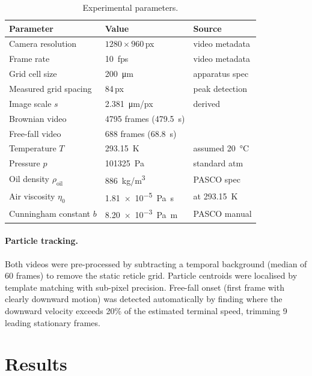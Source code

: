 \documentclass[12pt,a4paper]{article}
\begin{document}
\begin{table}[h]
\centering
\caption{Experimental parameters.}
\label{tab:setup}
\begin{tabular}{lll}
\toprule
Parameter & Value & Source \\
\midrule
Camera resolution        & $1280\times960$\,px         & video metadata \\
Frame rate               & \SI{10}{fps}                & video metadata \\
Grid cell size           & \SI{200}{\micro\metre}      & apparatus spec \\
Measured grid spacing    & 84\,px                      & peak detection \\
Image scale $s$          & \SI{2.381}{\micro\metre/px} & derived \\
Brownian video           & 4795 frames (\SI{479.5}{s}) &  \\
Free-fall video          & 688 frames (\SI{68.8}{s})   &  \\
Temperature $T$          & \SI{293.15}{\kelvin}        & assumed \SI{20}{\celsius} \\
Pressure $p$             & \SI{101325}{\pascal}        & standard atm \\
Oil density $\rho_\text{oil}$  & \SI{886}{\kilo\gram/\cubic\metre} & PASCO spec \\
Air viscosity $\eta_0$   & \SI{1.81e-5}{\pascal\second} & at \SI{293.15}{K} \\
Cunningham constant $b$  & \SI{8.20e-3}{\pascal\metre} & PASCO manual \\
\bottomrule
\end{tabular}
\end{table}

\paragraph{Particle tracking.}
Both videos were pre-processed by subtracting a temporal background (median
of 60 frames) to remove the static reticle grid.  Particle centroids were
localised by template matching with sub-pixel precision.  Free-fall onset
(first frame with clearly downward motion) was detected automatically by
finding where the downward velocity exceeds 20\% of the estimated terminal
speed, trimming 9 leading stationary frames.

\section{Results}
\end{document}
